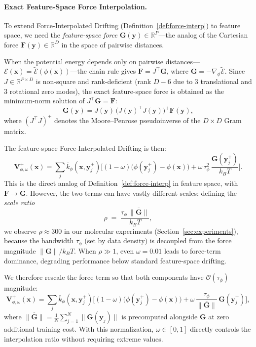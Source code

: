 \documentclass[11pt]{article}
\newcommand{\bx}{\mathbf{x}}
\newcommand{\by}{\mathbf{y}}
\newcommand{\bV}{\mathbf{V}}
\newcommand{\bF}{\mathbf{F}}
\newcommand{\bG}{\mathbf{G}}
\newcommand{\R}{\mathbb{R}}
\newcommand{\kbar}{\bar{k}}
\newcommand{\kBT}{k_BT}
\begin{document}
\paragraph{Exact Feature-Space Force Interpolation.}
To extend Force-Interpolated Drifting (Definition~\ref{def:force-interp}) to feature space, we need the \emph{feature-space force} $\bG(\by) \in \R^P$---the analog of the Cartesian force $\bF(\by) \in \R^D$ in the space of pairwise distances.

When the potential energy depends only on pairwise distances---$\mathcal{E}(\bx) = \tilde{\mathcal{E}}(\phi(\bx))$---the chain rule gives $\bF = J^\top\bG$, where $\bG = -\nabla_\phi\tilde{\mathcal{E}}$.
Since $J \in \R^{P \times D}$ is non-square and rank-deficient (rank $D - 6$ due to 3 translational and 3 rotational zero modes), the exact feature-space force is obtained as the minimum-norm solution of $J^\top\bG = \bF$:
\begin{equation}
    \boxed{\bG(\by) = J(\by)\,\big(J(\by)^\top J(\by)\big)^+\bF(\by),}
    \label{eq:exact-G}
\end{equation}
where $(J^\top J)^+$ denotes the Moore--Penrose pseudoinverse of the $D \times D$ Gram matrix.

The feature-space Force-Interpolated Drifting is then:
\begin{equation}
    \bV_{\phi,\omega}^+(\bx) = \sum_j \kbar_\phi(\bx,\by_j^+)\bigg[(1-\omega)\big(\phi(\by_j^+) - \phi(\bx)\big) + \omega\,\tau_\phi^2\,\frac{\bG(\by_j^+)}{\kBT}\bigg].
    \label{eq:feature-force-interp}
\end{equation}
This is the direct analog of Definition~\ref{def:force-interp} in feature space, with $\bF \to \bG$.
However, the two terms can have vastly different scales: defining the \emph{scale ratio}
\begin{equation}
    \rho \;=\; \frac{\tau_\phi\,\overline{\|\bG\|}}{\kBT},
    \label{eq:scale-ratio}
\end{equation}
we observe $\rho \approx 300$ in our molecular experiments (Section~\ref{sec:experiments}), because the bandwidth $\tau_\phi$ (set by data density) is decoupled from the force magnitude $\|\bG\|/\kBT$.
When $\rho \gg 1$, even $\omega = 0.01$ leads to force-term dominance, degrading performance below standard feature-space drifting.

We therefore rescale the force term so that both components have $\mathcal{O}(\tau_\phi)$ magnitude:
\begin{equation}
    \boxed{\bV_{\phi,\omega}^+(\bx) = \sum_j \kbar_\phi(\bx,\by_j^+)\bigg[(1-\omega)\big(\phi(\by_j^+) - \phi(\bx)\big) + \omega\,\frac{\tau_\phi}{\overline{\|\bG\|}}\,\bG(\by_j^+)\bigg],}
    \label{eq:feature-force-interp-norm}
\end{equation}
where $\overline{\|\bG\|} = \frac{1}{N}\sum_{j=1}^N \|\bG(\by_j)\|$ is precomputed alongside $\bG$ at zero additional training cost.
With this normalization, $\omega \in [0,1]$ directly controls the interpolation ratio without requiring extreme values.
\end{document}
